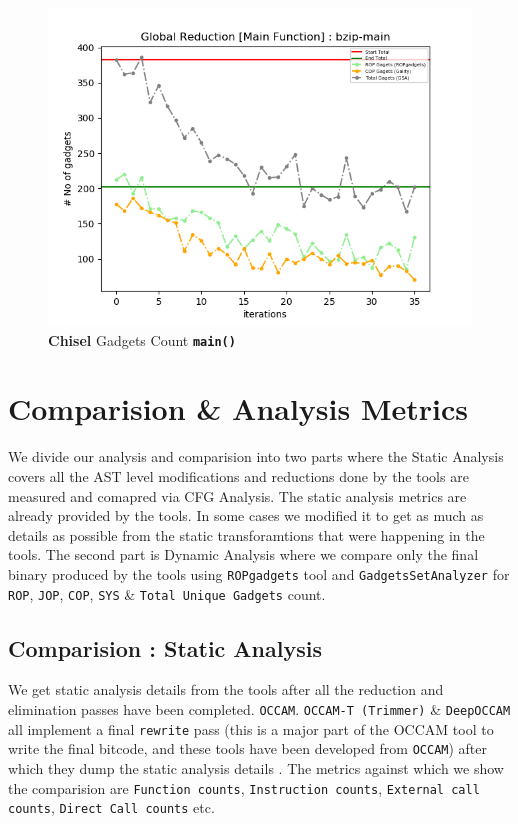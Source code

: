 \documentclass{relatorio}
\begin{document}
\begin{figure}[H]
	\includegraphics[width=1\linewidth]{imgs/plots/chisel_gadgets_bzip-main_plot.png}
	\caption{\textbf{Chisel} Gadgets Count \textbf{\texttt{main()}}}%
	\label{fig:plant}
\end{figure}

\section{Comparision \& Analysis Metrics}%
\label{Tools}

We divide our analysis and comparision into two parts where the Static Analysis covers all the AST level modifications and reductions done by the tools are measured and comapred via CFG Analysis. The static analysis metrics are already provided by the tools. In some cases we modified it to get as much as details as possible from the static transforamtions that were happening in the tools. The second part is Dynamic Analysis where we compare only the final binary produced by the tools using \texttt{ROPgadgets} tool and \texttt{GadgetsSetAnalyzer} for \texttt{ROP}, \texttt{JOP}, \texttt{COP}, \texttt{SYS} \& \texttt{Total Unique Gadgets} count. 

\subsection{Comparision : Static Analysis}%
\label{Tools}

We get static analysis details from the tools after all the reduction and elimination passes have been completed. \texttt{OCCAM}. \texttt{OCCAM-T (Trimmer)} \& \texttt{DeepOCCAM} all implement a final \texttt{rewrite} pass (this is a major part of the OCCAM tool to write the final bitcode, and these tools have been developed from \texttt{OCCAM}) after which they dump the static analysis details . The metrics against which we show the comparision are \texttt{Function counts}, \texttt{Instruction counts}, \texttt{External call counts}, \texttt{Direct Call counts} etc. 
\end{document}
